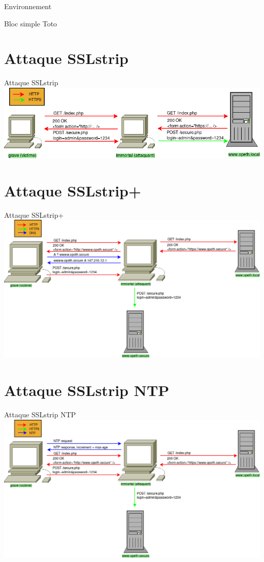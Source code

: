\documentclass{beamer}
\begin{document}
\begin{frame}{Environnement}
    \begin{block}{Bloc simple}
        Toto
    \end{block}
\end{frame}

\section{Attaque SSLstrip}
\begin{frame}{Attaque SSLstrip}
    \includegraphics[scale=0.4]{../medias/sslstrip/attack.png}
\end{frame}

\section{Attaque SSLstrip+}
\begin{frame}{Attaque SSLstrip+}
    \includegraphics[scale=0.32]{../medias/sslstrip2/attack.png}
\end{frame}

\section{Attaque SSLstrip NTP}
\begin{frame}{Attaque SSLstrip NTP}
    \includegraphics[scale=0.32]{../medias/sslstrip-ntp/attack.png}
\end{frame}
\end{document}
